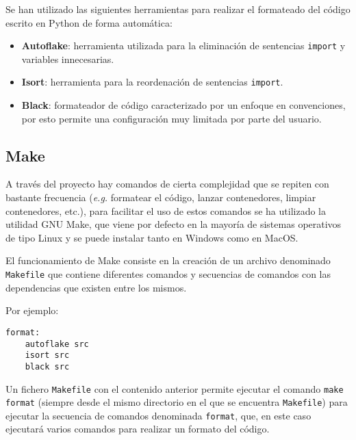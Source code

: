 Se han utilizado las siguientes herramientas para realizar el formateado del
código escrito en Python de forma automática:

\begin{itemize}
      \item \textbf{Autoflake}: herramienta utilizada para la eliminación de
            sentencias \texttt{import} y variables innecesarias.
      \item \textbf{Isort}: herramienta para la reordenación de sentencias
            \texttt{import}.
      \item \textbf{Black}: formateador de código caracterizado por un enfoque en
            convenciones, por esto permite una configuración muy limitada por
            parte del usuario.
\end{itemize}


\subsection{Make}

A través del proyecto hay comandos de cierta complejidad que se repiten con
bastante frecuencia (\textit{e.g.} formatear el código, lanzar contenedores, limpiar
contenedores, etc.), para facilitar el uso de estos comandos se ha utilizado la
utilidad GNU Make, que viene por defecto en la mayoría de sistemas operativos de
tipo Linux y se puede instalar tanto en Windows como en MacOS.

El funcionamiento de Make consiste en la creación de un archivo denominado
\texttt{Makefile} que contiene diferentes comandos y secuencias de comandos con
las dependencias que existen entre los mismos.

Por ejemplo:

\begin{verbatim}
format:
    autoflake src
    isort src
    black src
\end{verbatim}

Un fichero \texttt{Makefile} con el contenido anterior permite ejecutar el
comando \texttt{make format} (siempre desde el mismo directorio en el que se
encuentra \texttt{Makefile}) para ejecutar la secuencia de comandos denominada
\texttt{format}, que, en este caso ejecutará varios comandos para realizar un
formato del código.
